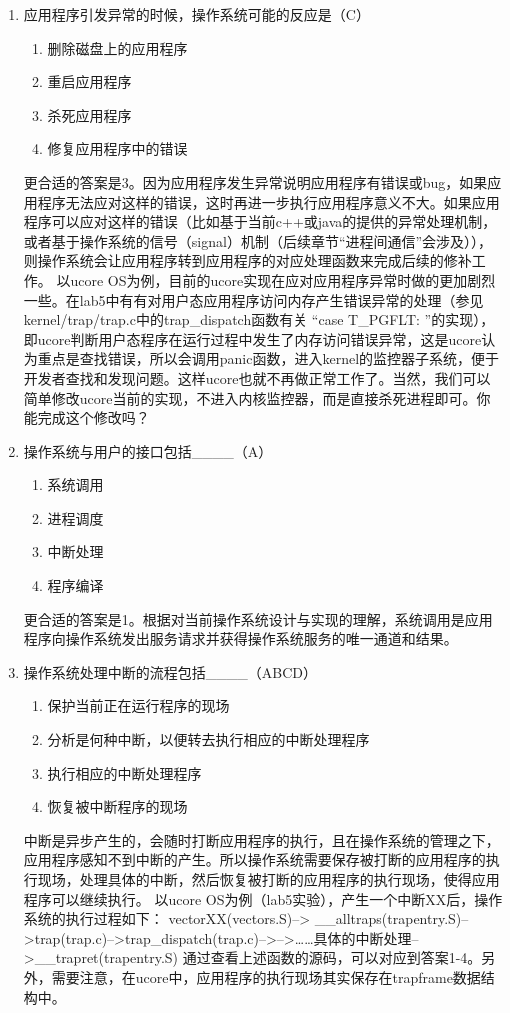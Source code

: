 \begin{enumerate}
\item 应用程序引发异常的时候，操作系统可能的反应是（C）
\begin{enumerate}[A]
	\item 删除磁盘上的应用程序
	\item 重启应用程序
	\item 杀死应用程序
	\item 修复应用程序中的错误
\end{enumerate}
更合适的答案是3。因为应用程序发生异常说明应用程序有错误或bug，如果应用程序无法应对这样的错误，这时再进一步执行应用程序意义不大。如果应用程序可以应对这样的错误（比如基于当前c++或java的提供的异常处理机制，或者基于操作系统的信号（signal）机制（后续章节“进程间通信”会涉及）），则操作系统会让应用程序转到应用程序的对应处理函数来完成后续的修补工作。 以ucore OS为例，目前的ucore实现在应对应用程序异常时做的更加剧烈一些。在lab5中有有对用户态应用程序访问内存产生错误异常的处理（参见 kernel/trap/trap.c中的trap\_dispatch函数有关 “case T\_PGFLT: ”的实现），即ucore判断用户态程序在运行过程中发生了内存访问错误异常，这是ucore认为重点是查找错误，所以会调用panic函数，进入kernel的监控器子系统，便于开发者查找和发现问题。这样ucore也就不再做正常工作了。当然，我们可以简单修改ucore当前的实现，不进入内核监控器，而是直接杀死进程即可。你能完成这个修改吗？

\item 操作系统与用户的接口包括\_\_\_\_（A）
\begin{enumerate}[A]
	\item 系统调用
	\item 进程调度
	\item 中断处理
	\item 程序编译
\end{enumerate}
更合适的答案是1。根据对当前操作系统设计与实现的理解，系统调用是应用程序向操作系统发出服务请求并获得操作系统服务的唯一通道和结果。

\item 操作系统处理中断的流程包括\_\_\_\_（ABCD）
\begin{enumerate}[A]
	\item 保护当前正在运行程序的现场   
	\item 分析是何种中断，以便转去执行相应的中断处理程序
	\item 执行相应的中断处理程序
	\item 恢复被中断程序的现场
\end{enumerate}
中断是异步产生的，会随时打断应用程序的执行，且在操作系统的管理之下，应用程序感知不到中断的产生。所以操作系统需要保存被打断的应用程序的执行现场，处理具体的中断，然后恢复被打断的应用程序的执行现场，使得应用程序可以继续执行。 以ucore OS为例（lab5实验），产生一个中断XX后，操作系统的执行过程如下： vectorXX(vectors.S)--> \_\_alltraps(trapentry.S)-->trap(trap.c)-->trap\_dispatch(trap.c)-->-->……具体的中断处理-->\_\_trapret(trapentry.S) 通过查看上述函数的源码，可以对应到答案1-4。另外，需要注意，在ucore中，应用程序的执行现场其实保存在trapframe数据结构中。



\end{enumerate}
